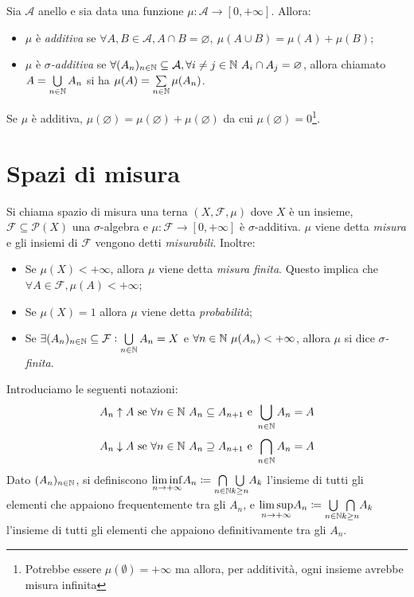 \begin{definition}
	Sia $\mathcal{A}$ anello e sia data una funzione $\mu:\mathcal{A} \rightarrow[0,+\infty]$. Allora:
	\begin{itemize}
		\item $\mu$ è \emph{additiva} se $\forall A,B \in \mathcal{A}, A\cap B=\varnothing,\ \mu( A\cup B)=\mu(A)+\mu(B)$;
		\item $\mu$ è \emph{$\sigma$-additiva} se $\forall (A_n)_{n\in\mathbb{N}}\subseteq \mathcal{A}, \forall i\neq j \in \mathbb{N} \ A_i\cap A_j =\varnothing$, allora chiamato $ A=\bigcup\limits_{n\in\mathbb{N}}A_n$ si ha $\mu(A)=\sum\limits_{n\in\mathbb{N}} \mu(A_n)$.
	\end{itemize}
\end{definition}

\begin{oss}
	Se $\mu$ è additiva, $\mu(\varnothing)=\mu(\varnothing)+\mu(\varnothing)$ da cui $\mu(\varnothing)=0$\footnote{Potrebbe essere $ \mu(\emptyset) = +\infty $ ma allora, per additività, ogni insieme avrebbe misura infinita}.
\end{oss}

\section{Spazi di misura}
\begin{definition}
	Si chiama spazio di misura una terna $(X,\mathcal{F}, \mu)$ dove $X$ è un insieme, ${\mathcal{F}\subseteq \mathscr{P}(X)}$ una $\sigma$-algebra e $\mu\colon\mathcal{F} \to [0,+\infty]$ è $\sigma$-additiva. $\mu$ viene detta \emph{misura} e gli insiemi di $\mathcal{F}$ vengono detti \emph{misurabili}.
	Inoltre:
	\begin{itemize}
		\item Se $\mu(X)<+\infty$, allora $\mu$ viene detta \emph{misura finita}. Questo implica che $\forall A \in \mathcal{F}, {\mu(A) < +\infty} $;
		\item Se $\mu(X)=1$ allora $\mu$ viene detta \emph{probabilità};
		\item Se $\exists (A_n)_{n\in\mathbb{N}}\subseteq\mathcal{F} : \bigcup\limits_{n\in\mathbb{N}}A_n=X$ e $\forall n \in\mathbb{N} \ \mu(A_n) <+\infty$, allora $\mu$ si dice \emph{$\sigma$-finita}.
	\end{itemize}
\end{definition}
Introduciamo le seguenti notazioni:
\[ A_n \uparrow   A \text{ se } \forall n \in\mathbb{N} \ A_n \subseteq A_{n+1} \text{ e } \bigcup\limits_{n\in \mathbb{N}}A_n = A \]
\[ A_n \downarrow A \text{ se } \forall n \in\N \ A_n \supseteq A_{n+1} \text{ e } \bigcap\limits_{n\in \N}A_n = A \]
Dato $(A_n)_{n\in\mathbb{N}}$, si definiscono $\underset{n\to+\infty}{\liminf}A_n \coloneqq\underset{n\in\mathbb{N}}{\bigcap}\underset{k\geq n}{\bigcup}A_k$ l'insieme di tutti gli elementi che appaiono frequentemente tra gli $A_n$, e $\underset{n\to +\infty}{\limsup}A_n\coloneqq\underset{n\in\mathbb{N}}{\bigcup}\underset{k\geq n}{\bigcap}A_k$ l'insieme di tutti gli elementi che appaiono definitivamente tra gli $A_n$.

